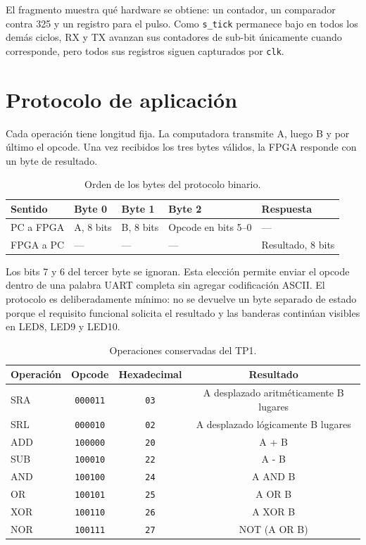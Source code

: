 El fragmento muestra qué hardware se obtiene: un contador, un
comparador contra 325 y un registro para el pulso. Como
\texttt{s\_tick} permanece bajo en todos los demás ciclos, RX y TX
avanzan sus contadores de sub-bit únicamente cuando corresponde, pero
todos sus registros siguen capturados por \texttt{clk}.

\section{Protocolo de aplicación}

Cada operación tiene longitud fija. La computadora transmite A, luego
B y por último el opcode. Una vez recibidos los tres bytes válidos,
la FPGA responde con un byte de resultado.

\begin{table}[H]
  \centering
  \begin{tabularx}{0.94\textwidth}{ZZZZZ}
    \toprule
    \textbf{Sentido} & \textbf{Byte 0} & \textbf{Byte 1} &
    \textbf{Byte 2} & \textbf{Respuesta} \\
    \midrule
    PC a FPGA & A, 8 bits & B, 8 bits &
    Opcode en bits 5--0 & --- \\
    FPGA a PC & --- & --- & --- & Resultado, 8 bits \\
    \bottomrule
  \end{tabularx}
  \caption{Orden de los bytes del protocolo binario.}%
\end{table}

Los bits 7 y 6 del tercer byte se ignoran. Esta elección permite
enviar el opcode dentro de una palabra UART completa sin agregar
codificación ASCII. El protocolo es deliberadamente mínimo: no se
devuelve un byte separado de estado porque el requisito funcional
solicita el resultado y las banderas continúan visibles en LED8, LED9 y LED10.

\begin{table}[H]
  \centering
  \begin{tabular}{lccc}
    \toprule
    \textbf{Operación} & \textbf{Opcode} & \textbf{Hexadecimal} &
    \textbf{Resultado} \\
    \midrule
    SRA & \texttt{000011} & \texttt{03} & A desplazado aritméticamente
    B lugares \\
    SRL & \texttt{000010} & \texttt{02} & A desplazado lógicamente B lugares \\
    ADD & \texttt{100000} & \texttt{20} & A + B \\
    SUB & \texttt{100010} & \texttt{22} & A - B \\
    AND & \texttt{100100} & \texttt{24} & A AND B \\
    OR  & \texttt{100101} & \texttt{25} & A OR B \\
    XOR & \texttt{100110} & \texttt{26} & A XOR B \\
    NOR & \texttt{100111} & \texttt{27} & NOT (A OR B) \\
    \bottomrule
  \end{tabular}
  \caption{Operaciones conservadas del TP1.}%
\end{table}

